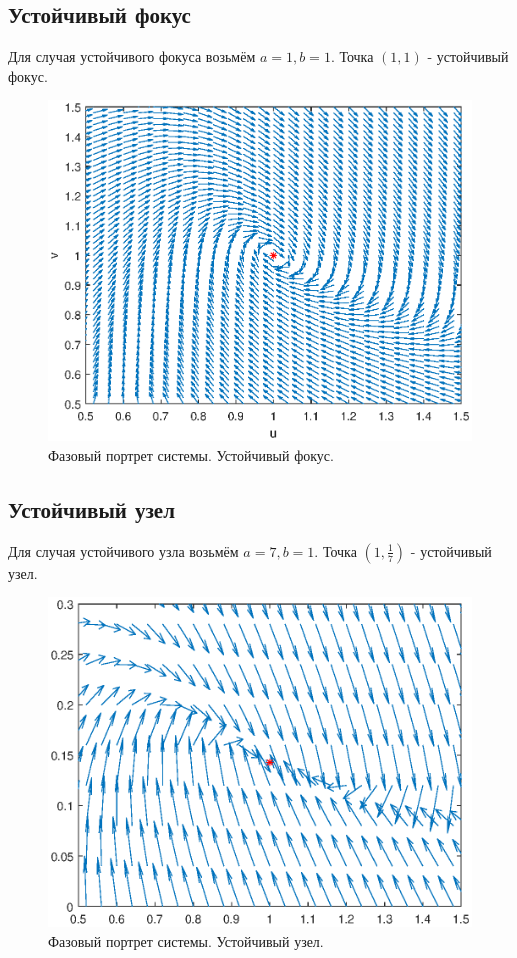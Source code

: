 \documentclass[12pt]{article}
\begin{document}
\subsection{Устойчивый фокус}
    Для случая устойчивого фокуса возьмём $a = 1, b = 1$. Точка $\left(1, 1\right)$ - устойчивый фокус.
    \begin{figure} [H]
        \begin{center}
        \includegraphics[width=1\textwidth]{phaseport3.eps}
        \caption{Фазовый портрет системы. Устойчивый фокус.}
        \label{pic4}
        \end{center}
    \end{figure}
\newpage
\subsection{Устойчивый узел}
    Для случая устойчивого узла возьмём $a = 7, b = 1$. Точка $\left(1, \frac{1}{7}\right)$ - устойчивый узел.
    \begin{figure} [H]
        \begin{center}
        \includegraphics[width=1\textwidth]{phaseport4.eps}
        \caption{Фазовый портрет системы. Устойчивый узел.}
        \label{pic5}
        \end{center}
    \end{figure}
\end{document}
